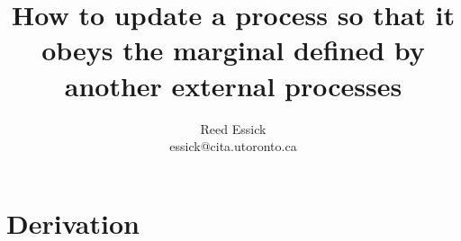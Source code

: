 \documentclass[onecolumn]{article}
\begin{document}

\title{
How to update a process so that it obeys the marginal defined by another external processes
}

\author{Reed Essick \\ essick@cita.utoronto.ca}

\maketitle


\section*{Derivation}
\label{sec:derivation}
\end{document}
